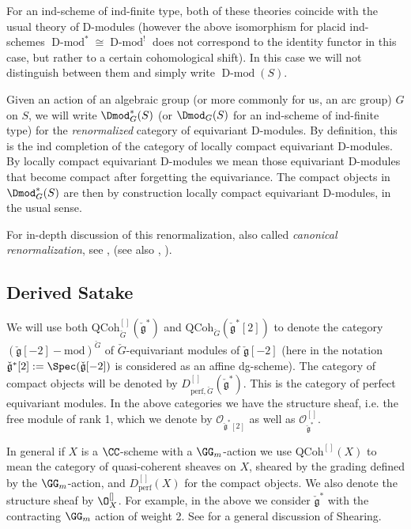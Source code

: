 \documentclass[11pt]{article}
\begin{document}
For an ind-scheme of ind-finite type, both of these theories coincide with the usual theory of D-modules (however the above isomorphism for placid ind-schemes $\operatorname{D-mod}^*\cong \operatorname{D-mod}^!$ does not correspond to the identity functor in this case, but rather to a certain cohomological shift). In this case we will not distinguish between them and simply write $\operatorname{D-mod}(S)$.

Given an action of an algebraic group (or more commonly for us, an arc group) $G$ on $S$, we will write $\Dmod^*_G(S)$ (or $\Dmod_G(S)$ for an ind-scheme of ind-finite type) for the {\it renormalized} category of equivariant D-modules. By definition, this is the ind completion of the category of locally compact equivariant D-modules. By locally compact equivariant D-modules we mean those equivariant D-modules that become compact after forgetting the equivariance. The compact objects in $\Dmod^*_G(S)$ are then by construction locally compact equivariant D-modules, in the usual sense.

For in-depth discussion of this renormalization, also called {\it canonical renormalization}, see \cite{Ras2}, (see also \cite[Appendix B]{BZSV}, \cite[§12]{AD}).

\subsection{Derived Satake}\label{sec: derived Satake}
We will use both $\mathrm{QCoh}^{[]}_{\check{G}}(\check{\mathfrak{g}}^*)$ and $\mathrm{QCoh}_{\check{G}}(\check{\mathfrak{g}}^*[2])$ to denote the category $(\operatorname{\check{\mathfrak{g}}[-2]-mod})^{\check{G}}$ of $\check{G}$-equivariant modules of $\check{\mathfrak{g}}[-2]$ (here in the notation $\check{\mathfrak{g}}^*[2]:=\Spec(\check{\mathfrak{g}}[-2])$ is considered as an affine dg-scheme). The category of compact objects will be denoted by $D^{[]}_{\mathrm{perf},\check{G}}(\check{\mathfrak{g}}^*)$. This is the category of perfect equivariant modules.
In the above categories we have the structure sheaf, i.e. the free module of rank 1, which we denote by $\mathcal{O}_{\check{\mathfrak{g}}^*[2]}$ as well as $\mathcal{O}^{[]}_{\check{\mathfrak{g}}^*}$.

In general if $X$ is a $\CC$-scheme with a $\GG_m$-action we use $\mathrm{QCoh}^{[]}(X)$ to mean the category of quasi-coherent sheaves on $X$, sheared by the grading defined by the $\GG_m$-action, and $D_{\mathrm{perf}}^{[]}(X)$ for the compact objects. We also denote the structure sheaf by $\O^{[]}_{X}$. For example, in the above we consider $\check{\mathfrak{g}}^*$ with the contracting $\GG_m$ action of weight 2. See \cite[§6]{BZSV} for a general discussion of Shearing.
\end{document}
